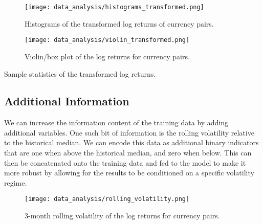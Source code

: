 \begin{figure}[!htb]
    \begin{center}
        \texttt{[image: data\_analysis/histograms\_transformed.png]}
    \end{center}
    \caption{Histograms of the transformed log returns of currency pairs.}
    \label{fig:histograms_transformed}
\end{figure}
\begin{figure}[!htb]
    \begin{center}
        \texttt{[image: data\_analysis/violin\_transformed.png]}
    \end{center}
    \caption{Violin/box plot of the log returns for currency pairs.}
    \label{fig:violin_transformed}
\end{figure}
\begin{table}[!htb]
    \centering
    \begin{adjustbox}{max width=\textwidth}
        
    \end{adjustbox}
    \caption{Sample statistics of the transformed log returns.}
    \label{tbl:data_log_returns_transformed_stats}
\end{table}

\subsection{Additional Information}
We can increase the information content of the training data by adding additional variables.
One such bit of information is the rolling volatility relative to the historical median.
We can encode this data as additional binary indicators that are one when above the historical median, and zero when below.
This can then be concatenated onto the training data and fed to the model to make it more robust by allowing for the results to be conditioned on a specific volatility regime.
\begin{figure}[!htb]
    \begin{center}
        \texttt{[image: data\_analysis/rolling\_volatility.png]}
    \end{center}
    \caption{3-month rolling volatility of the log returns for currency pairs.}
    \label{fig:rolling_volatility}
\end{figure}
